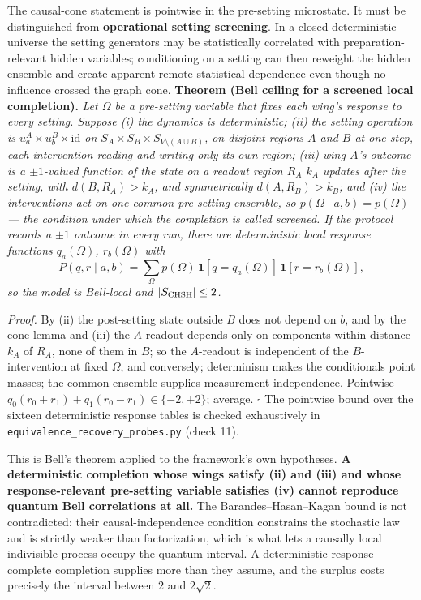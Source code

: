 \documentclass[
]{article}
\begin{document}
The causal-cone statement is pointwise in the pre-setting microstate. It
must be distinguished from \textbf{operational setting screening}. In a
closed deterministic universe the setting generators may be
statistically correlated with preparation-relevant hidden variables;
conditioning on a setting can then reweight the hidden ensemble and
create apparent remote statistical dependence even though no influence
crossed the graph cone. \textbf{Theorem (Bell ceiling for a screened
local completion).} \emph{Let \(\Omega\) be a pre-setting variable that
fixes each wing's response to every setting. Suppose (i) the dynamics is
deterministic; (ii) the setting operation is
\(u^A_a \times u^B_b \times \mathrm{id}\) on
\(S_A \times S_B \times S_{V \setminus (A \cup B)}\), on disjoint
regions \(A\) and \(B\) at one step, each intervention reading and
writing only its own region; (iii) wing \(A\)'s outcome is a
\(\pm1\)-valued function of the state on a readout region \(R_A\)
\(k_A\) updates after the setting, with \(d(B, R_A) > k_A\), and
symmetrically \(d(A, R_B) > k_B\); and (iv) the interventions act on one
common pre-setting ensemble, so \(p(\Omega\mid a,b)=p(\Omega)\) --- the
condition under which the completion is called screened. If the protocol
records a \(\pm1\) outcome in every run, there are deterministic local
response functions \(q_a(\Omega)\), \(r_b(\Omega)\) with} \[
P(q,r\mid a,b)=\sum_\Omega p(\Omega)\,
\mathbf 1[q=q_a(\Omega)]\,\mathbf 1[r=r_b(\Omega)],
\] \emph{so the model is Bell-local and \(|S_{\rm CHSH}|\le 2\).}

\emph{Proof.} By (ii) the post-setting state outside \(B\) does not
depend on \(b\), and by the cone lemma and (iii) the \(A\)-readout
depends only on components within distance \(k_A\) of \(R_A\), none of
them in \(B\); so the \(A\)-readout is independent of the
\(B\)-intervention at fixed \(\Omega\), and conversely; determinism
makes the conditionals point masses; the common ensemble supplies
measurement independence. Pointwise
\(q_0(r_0+r_1)+q_1(r_0-r_1)\in\{-2,+2\}\); average. \(\square\) The
pointwise bound over the sixteen deterministic response tables is
checked exhaustively in \texttt{equivalence\_recovery\_probes.py} (check
11).

This is Bell's theorem applied to the framework's own hypotheses.
\textbf{A deterministic completion whose wings satisfy (ii) and (iii)
and whose response-relevant pre-setting variable satisfies (iv) cannot
reproduce quantum Bell correlations at all.} The Barandes--Hasan--Kagan
bound is not contradicted: their causal-independence condition
constrains the stochastic law and is strictly weaker than factorization,
which is what lets a causally local indivisible process occupy the
quantum interval. A deterministic response-complete completion supplies
more than they assume, and the surplus costs precisely the interval
between \(2\) and \(2\sqrt2\).
\end{document}
